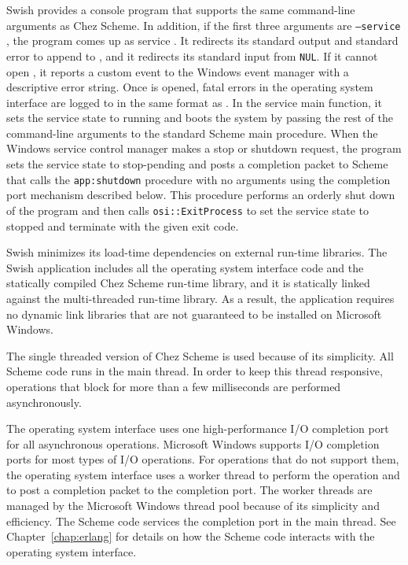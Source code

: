 Swish provides a console program that supports the same
command-line arguments as Chez Scheme.  In addition, if the first
three arguments are \texttt{--service 
  }, the program comes up as service
. It redirects its standard output and standard
error to append to , and it redirects its standard input
from \texttt{NUL}.  If it cannot open , it reports a
custom event to the Windows event manager with a descriptive error
string. Once  is opened, fatal errors in the operating
system interface are logged to  in the same format as
. In the service main function, it sets
the service state to running and boots the system by passing the rest
of the command-line arguments to the standard Scheme main
procedure. When the Windows service control manager makes a stop or
shutdown request, the program sets the service state to
stop-pending and posts a completion packet to Scheme that calls the
\texttt{app:shutdown} procedure with no arguments using the completion
port mechanism described below. This procedure performs an orderly
shut down of the program and then calls \texttt{osi::ExitProcess}
to set the service state to stopped and terminate with the given exit
code.

Swish minimizes its load-time dependencies on external run-time
libraries.  The Swish application includes all the operating system
interface code and the statically compiled Chez Scheme run-time
library, and it is statically linked against the multi-threaded
run-time library.  As a result, the application requires no dynamic
link libraries that are not guaranteed to be installed on Microsoft
Windows.

The single threaded version of Chez Scheme is used because of its
simplicity. All Scheme code runs in the main thread. In order to keep
this thread responsive, operations that block for more than a few
milliseconds are performed asynchronously.

The operating system interface uses one high-performance I/O
completion port~\cite{multithreaded-async-io} for all asynchronous
operations. Microsoft Windows supports I/O completion ports for most
types of I/O operations. For operations that do not support them, the
operating system interface uses a worker thread to perform the
operation and to post a completion packet to the completion port.  The
worker threads are managed by the Microsoft Windows thread pool
because of its simplicity and efficiency. The Scheme code services the
completion port in the main thread. See Chapter~\ref{chap:erlang} for
details on how the Scheme code interacts with the operating system
interface.

